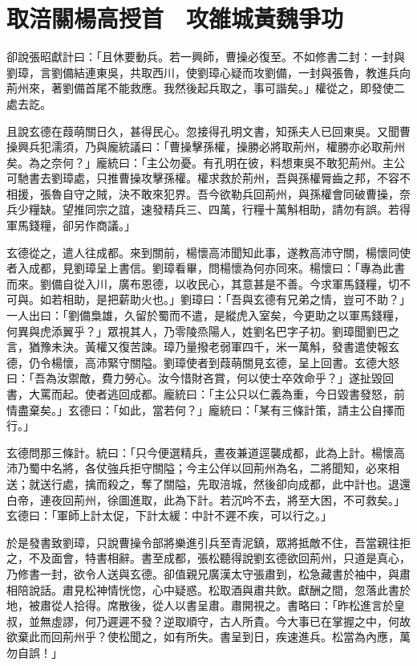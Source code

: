 
\chapter{取涪關楊高授首　攻雒城黃魏爭功}

卻說張昭獻計曰：「且休要動兵。若一興師，曹操必復至。不如修書二封：一封與劉璋，言劉備結連東吳，共取西川，使劉璋心疑而攻劉備，一封與張魯，教進兵向荊州來，著劉備首尾不能救應。我然後起兵取之，事可諧矣。」權從之，即發使二處去訖。

且說玄德在葭萌關日久，甚得民心。忽接得孔明文書，知孫夫人已回東吳。又聞曹操興兵犯濡須，乃與龐統議曰：「曹操擊孫權，操勝必將取荊州，權勝亦必取荊州矣。為之奈何？」龐統曰：「主公勿憂。有孔明在彼，料想東吳不敢犯荊州。主公可馳書去劉璋處，只推曹操攻擊孫權。權求救於荊州，吾與孫權脣齒之邦，不容不相援，張魯自守之賊，決不敢來犯界。吾今欲勒兵回荊州，與孫權會同破曹操，奈兵少糧缺。望推同宗之誼，速發精兵三、四萬，行糧十萬斛相助，請勿有誤。若得軍馬錢糧，卻另作商議。」

玄德從之，遣人往成都。來到關前，楊懷高沛聞知此事，遂教高沛守關，楊懷同使者入成都，見劉璋呈上書信。劉璋看畢，問楊懷為何亦同來。楊懷曰：「專為此書而來。劉備自從入川，廣布恩德，以收民心，其意甚是不善。今求軍馬錢糧，切不可與。如若相助，是把薪助火也。」劉璋曰：「吾與玄德有兄弟之情，豈可不助？」一人出曰：「劉備梟雄，久留於蜀而不遣，是縱虎入室矣，今更助之以軍馬錢糧，何異與虎添翼乎？」眾視其人，乃零陵烝陽人，姓劉名巴字子初。劉璋聞劉巴之言，猶豫未決。黃權又復苦諫。璋乃量撥老弱軍四千，米一萬斛，發書遣使報玄德，仍令楊懷，高沛緊守關隘。劉璋使者到葭萌關見玄德，呈上回書。玄德大怒曰：「吾為汝禦敵，費力勞心。汝今惜財吝賞，何以使士卒效命乎？」遂扯毀回書，大罵而起。使者逃回成都。龐統曰：「主公只以仁義為重，今日毀書發怒，前情盡棄矣。」玄德曰：「如此，當若何？」龐統曰：「某有三條計策，請主公自擇而行。」

玄德問那三條計。統曰：「只今便選精兵，晝夜兼道逕襲成都，此為上計。楊懷高沛乃蜀中名將，各仗強兵拒守關隘；今主公佯以回荊州為名，二將聞知，必來相送；就送行處，擒而殺之，奪了關隘，先取涪城，然後卻向成都，此中計也。退還白帝，連夜回荊州，徐圖進取，此為下計。若沉吟不去，將至大困，不可救矣。」玄德曰：「軍師上計太促，下計太緩：中計不遲不疾，可以行之。」

於是發書致劉璋，只說曹操令部將樂進引兵至青泥鎮，眾將抵敵不住，吾當親往拒之，不及面會，特書相辭。書至成都，張松聽得說劉玄德欲回荊州，只道是真心，乃修書一封，欲令人送與玄德。卻值親兄廣漢太守張肅到，松急藏書於袖中，與肅相陪說話。肅見松神情恍惚，心中疑惑。松取酒與肅共飲。獻酬之間，忽落此書於地，被肅從人拾得。席散後，從人以書呈肅。肅開視之。書略曰：「昨松進言於皇叔，並無虛謬，何乃遲遲不發？逆取順守，古人所貴。今大事已在掌握之中，何故欲棄此而回荊州乎？使松聞之，如有所失。書呈到日，疾速進兵。松當為內應，萬勿自誤！」

